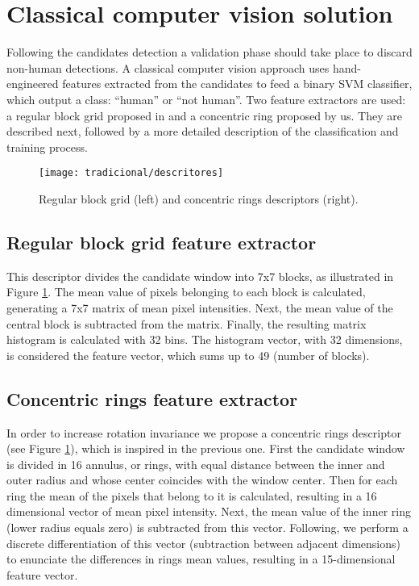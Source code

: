 \section{Classical computer vision solution}
\label{sec:classical}

    Following the candidates detection a validation phase should take place to discard non-human detections. A classical computer vision approach \cite{rauter} uses hand-engineered features extracted from the candidates to feed a binary SVM classifier, which output a class: ``human'' or ``not human''. Two feature extractors are used: a regular block grid proposed in \cite{rauter} and a concentric ring proposed by us. They are described next, followed by a more detailed description of the classification and training process.

    \begin{figure}
    \centering
    \texttt{[image: tradicional/descritores]}
    \caption{Regular block grid (left) and concentric rings descriptors (right).}
    \label{fig:descriptors}
    \end{figure}

    \subsection{Regular block grid feature extractor}
      This descriptor divides the candidate window into 7x7 blocks, as illustrated in Figure \ref{fig:descriptors}. The mean value of pixels belonging to each block is calculated, generating a 7x7 matrix of mean pixel intensities. Next, the mean value of the central block is subtracted from the matrix. Finally, the resulting matrix histogram is calculated with 32 bins. The histogram vector, with 32 dimensions, is considered the feature vector, which sums up to 49 (number of blocks).

    \subsection{Concentric rings feature extractor}
      In order to increase rotation invariance we propose a concentric rings descriptor (see Figure \ref{fig:descriptors}), which is inspired in the previous one. First the candidate window is divided in 16 annulus, or rings, with equal distance between the inner and outer radius and whose center coincides with the window center. Then for each ring the mean of the pixels that belong to it is calculated, resulting in a 16 dimensional vector of mean pixel intensity. Next, the mean value of the inner ring (lower radius equals zero) is subtracted from this vector. Following, we perform a discrete differentiation of this vector (subtraction between adjacent dimensions) to enunciate the differences in rings mean values, resulting in a 15-dimensional feature vector.

